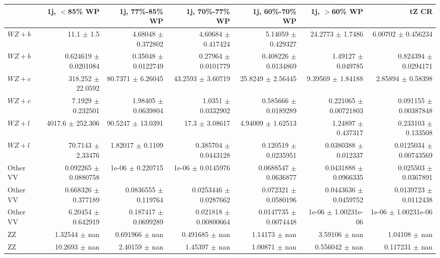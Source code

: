 \begin{table}[H]
\begin{center}
\begin{tabular}{|l|n{5}{2}|n{5}{2}|n{5}{2}|n{5}{2}|n{5}{2}|n{5}{2}|}
\hline 
 & {1j, $<$85\% WP} & {1j, 77\%-85\% WP} & {1j, 70\%-77\% WP} & {1j, 60\%-70\% WP} & {1j, $>$60\% WP} & {tZ CR}\\
\hline 
  $WZ + b$   & 11.1 $\pm$ 1.5 & 4.68048 $\pm$ 0.372802 & 4.60684 $\pm$ 0.417424 & 5.14059 $\pm$ 0.429327 & 24.2773 $\pm$ 1.7486 & 6.00702 $\pm$ 0.456234 \\ 
  $WZ + b$   & 0.624619 $\pm$ 0.0201084 & 0.35048 $\pm$ 0.0122749 & 0.27964 $\pm$ 0.0101779 & 0.408226 $\pm$ 0.0134869 & 1.49127 $\pm$ 0.049785 & 0.824394 $\pm$ 0.0294171 \\ 
  $WZ + c$   & 318.252 $\pm$ 22.0592 & 80.7371 $\pm$ 6.26045 & 43.2593 $\pm$ 3.60719 & 25.8249 $\pm$ 2.56445 & 9.39569 $\pm$ 1.84188 & 2.85894 $\pm$ 0.58398 \\ 
  $WZ + c$   & 7.1929 $\pm$ 0.232501 & 1.98405 $\pm$ 0.0639804 & 1.0351 $\pm$ 0.0332902 & 0.585666 $\pm$ 0.0189289 & 0.221065 $\pm$ 0.00721803 & 0.091155 $\pm$ 0.00387848 \\ 
  $WZ + l$   & 4017.6 $\pm$ 252.306 & 90.5247 $\pm$ 13.0391 & 17.3 $\pm$ 3.08617 & 4.94009 $\pm$ 1.62513 & 1.24897 $\pm$ 0.437317 & 0.233103 $\pm$ 0.133508 \\ 
  $WZ + l$   & 70.7143 $\pm$ 2.33476 & 1.82017 $\pm$ 0.1109 & 0.385704 $\pm$ 0.0443128 & 0.120519 $\pm$ 0.0235951 & 0.0380388 $\pm$ 0.012337 & 0.0125034 $\pm$ 0.00743569 \\ 
  Other VV   & 0.092265 $\pm$ 0.0880758 & 1e-06 $\pm$ 0.220715 & 1e-06 $\pm$ 0.0145976 & 0.0688547 $\pm$ 0.0636877 & 0.0431888 $\pm$ 0.0966335 & 0.025503 $\pm$ 0.0367891 \\ 
  Other VV   & 0.668326 $\pm$ 0.377189 & 0.0836555 $\pm$ 0.119764 & 0.0253446 $\pm$ 0.0287662 & 0.072321 $\pm$ 0.0580196 & 0.0443636 $\pm$ 0.0459752 & 0.0139723 $\pm$ 0.0112438 \\ 
  Other VV   & 6.20454 $\pm$ 0.642919 & 0.187417 $\pm$ 0.0699289 & 0.021818 $\pm$ 0.00800664 & 0.0147735 $\pm$ 0.0074448 & 1e-06 $\pm$ 1.00231e-06 & 1e-06 $\pm$ 1.00231e-06 \\ 
  ZZ   & 1.32544 $\pm$ nan & 0.691966 $\pm$ nan & 0.491685 $\pm$ nan & 1.14173 $\pm$ nan & 3.59106 $\pm$ nan & 1.04108 $\pm$ nan \\ 
  ZZ   & 10.2693 $\pm$ nan & 2.40159 $\pm$ nan & 1.45397 $\pm$ nan & 1.00871 $\pm$ nan & 0.556042 $\pm$ nan & 0.117231 $\pm$ nan \\ 

\end{tabular}
\end{center}
\end{table}
